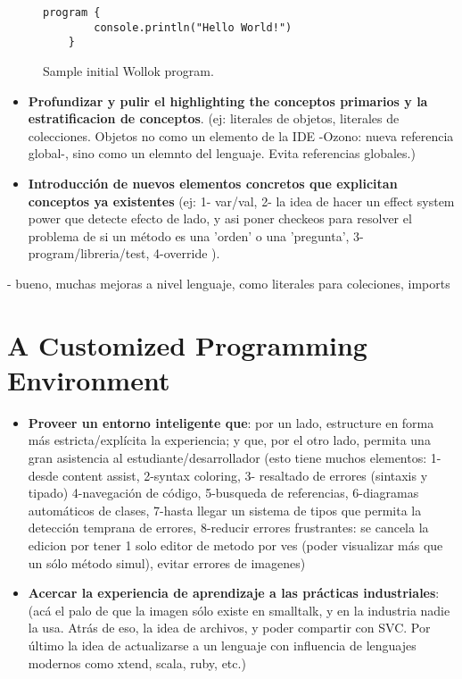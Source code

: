 \begin{figure}[h]
 \centering
 \begin{lstlisting}[language=Wollok]
	program {
		console.println("Hello World!")
	}
 \end{lstlisting}
 
 \caption{\small Sample initial Wollok program.}
 \label{fig:helloWorld/wollok}
\end{figure}

\begin{itemize}
\item \textbf{Profundizar y pulir el highlighting the conceptos primarios y la
estratificacion de conceptos}.
	(ej: literales de objetos, literales de colecciones. Objetos no como un
	elemento de la IDE -Ozono: nueva referencia global-, sino como un elemnto del
	lenguaje. Evita referencias globales.)
\item \textbf{Introducción de nuevos elementos concretos que explicitan
conceptos ya existentes} (ej: 1- var/val, 2- la idea de hacer un effect system
power que detecte efecto de lado, y asi poner checkeos para resolver el problema de si un método es una 'orden' o una 'pregunta', 3- program/libreria/test, 4-override ).
\end{itemize}

- bueno, muchas mejoras a nivel lenguaje, como literales para coleciones, imports


\section{A Customized Programming Environment}
\label{sec:environment}


\begin{itemize}
\item \textbf{Proveer un entorno inteligente que}: por un lado, estructure en
forma más estricta/explícita la experiencia; y que, por el otro lado, permita una gran asistencia al estudiante/desarrollador (esto tiene muchos elementos: 1- desde content assist, 2-syntax coloring, 3- resaltado de errores (sintaxis y tipado) 4-navegación de código, 5-busqueda de referencias, 6-diagramas automáticos de clases, 7-hasta llegar un sistema de tipos que permita la detección temprana de errores, 8-reducir errores frustrantes: se cancela la edicion por tener 1 solo editor de metodo por ves (poder visualizar más que un sólo método simul), evitar errores de imagenes)
\item \textbf{Acercar la experiencia de aprendizaje a las prácticas
industriales}: (acá el palo de que la imagen sólo existe en smalltalk, y en la
industria nadie la usa. Atrás de eso, la idea de archivos, y poder compartir con SVC. Por último la idea de actualizarse a un lenguaje con influencia de lenguajes modernos como xtend, scala, ruby, etc.)
\end{itemize}

